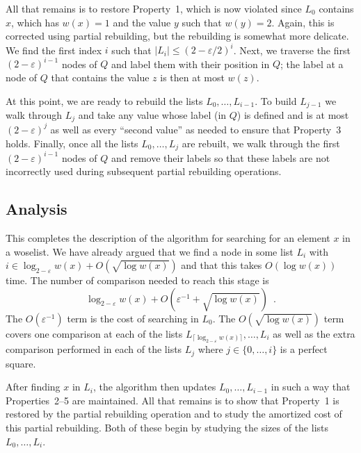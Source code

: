 \documentclass[lotsofwhite]{patmorin}
\newcommand{\eps}{\varepsilon}
\begin{document}
All that remains is to restore Property~1, which is now violated
since $L_0$ contains $x$, which has $w(x)=1$ and the value $y$ such
that $w(y)=2$.  Again, this is corrected using partial rebuilding,
but the rebuilding is somewhat more delicate.  We find the first index
$i$ such that $|L_i|\le (2-\eps/2)^i$.  Next, we traverse the first
$(2-\eps)^{i-1}$ nodes of $Q$ and label them with their position in
$Q$; the label at a node of $Q$ that contains the value $z$ is then at
most $w(z)$.  

At this point, we are ready to rebuild the lists $L_0,\ldots,L_{i-1}$. To
build $L_{j-1}$ we walk through $L_j$ and take any value whose label
(in $Q$) is defined and is at most $(2-\eps)^j$ as well as every
``second value'' as needed to ensure that Property~3 holds.  Finally,
once all the lists $L_0,\ldots,L_j$ are rebuilt, we walk through the first
$(2-\eps)^{i-1}$ nodes of $Q$ and remove their labels so that these labels
are not incorrectly used during subsequent partial rebuilding operations.

\subsection{Analysis}

This completes the description of the algorithm for searching for an
element $x$ in a woselist.  We have already argued that we find a node
in some list $L_i$ with $i\in \log_{2-\eps} w(x) + O(\sqrt{\log w(x)})$
and that this takes $O(\log w(x))$ time.  The number of comparison needed
to reach this stage is
\[
     \log_{2-\eps} w(x) + O(\eps^{-1} + \sqrt{\log w(x)}) \enspace .
\]
The $O(\eps^{-1})$ term is the cost of searching in $L_0$. The 
$O(\sqrt{\log w(x)})$ term covers one comparison at each of the lists
$L_{\lceil\log_{2-\eps} w(x)\rceil},\ldots,L_i$ as well as the extra
comparison performed in each of the lists $L_j$ where $j\in\{0,\ldots,i\}$
is a perfect square.

After finding $x$ in $L_i$, the algorithm then updates
$L_0,\ldots,L_{i-1}$ in such a way that Properties~2--5 are maintained.
All that remains is to show that Property~1 is restored by the partial
rebuilding operation and to study the amortized cost of this partial
rebuilding.  Both of these begin by studying the sizes of the lists
$L_0,\ldots,L_i$.
\end{document}
